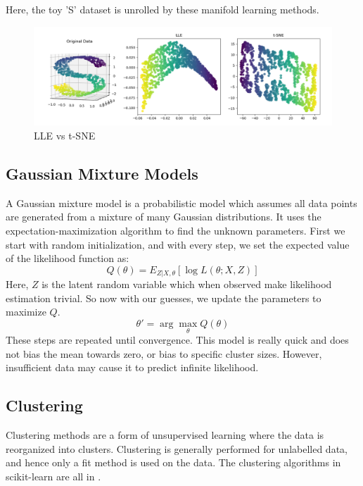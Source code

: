 \documentclass{article}
\newcommand{\code}[1]{{\fontfamily{zi4} \selectfont{#1}}}
\begin{document}
Here, the toy 'S' dataset is unrolled by these manifold learning methods.
\begin{figure}[H]
\includegraphics[width=\linewidth]{Images/lle_tsne.png}
\centering
\caption{LLE vs t-SNE}
\end{figure}


\subsection{Gaussian Mixture Models}
A Gaussian mixture model is a probabilistic model which assumes all data points are generated from a mixture of many Gaussian distributions. It uses the expectation-maximization algorithm to find the unknown parameters. First we start with random initialization, and with every step, we set the expected value of the likelihood function as:
$$Q(\theta) = E_{Z|X, \theta}[\log L(\theta; X, Z)]$$
Here, $Z$ is the latent random variable which when observed make likelihood estimation trivial. So now with our guesses, we update the parameters to maximize $Q$.
$$\theta' = \arg \max_{\theta} Q(\theta)$$
These steps are repeated until convergence. This model is really quick and does not bias the mean towards zero, or bias to specific cluster sizes. However, insufficient data may cause it to predict infinite likelihood.

\subsection{Clustering}

Clustering methods are a form of unsupervised learning where the data is reorganized into clusters. Clustering is generally performed for unlabelled data, and hence only a fit method is used on the data. The clustering algorithms in scikit-learn are all in \code{sklearn.cluster}.
\end{document}
